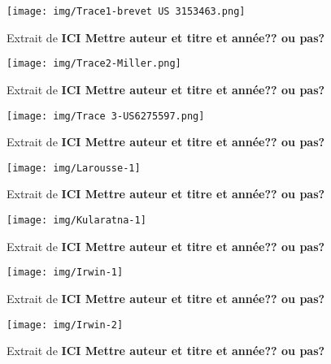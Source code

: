 \begin{figure}
\begin{center}
\texttt{[image: img/Trace1-brevet US 3153463.png]}
\end{center}
\caption{Extrait de \cite{f1964compound} \textbf{ICI Mettre auteur et titre et année?? ou pas?}} %
\label{Trace 1}
\end{figure}

\begin{figure}
\begin{center}
\texttt{[image: img/Trace2-Miller.png]}
\end{center}
\caption{Extrait de \cite[p.~2]{Miller} \textbf{ICI Mettre auteur et titre et année?? ou pas?}} %
\label{Trace 2}
\end{figure}

\begin{figure}
\begin{center}
\texttt{[image: img/Trace 3-US6275597.png]}
\end{center}
\caption{Extrait de \cite{US6275597} \textbf{ICI Mettre auteur et titre et année?? ou pas?}} %
 \label{Trace 3}
\end{figure}

\begin{figure}
\begin{center}
\texttt{[image: img/Larousse-1]}
\end{center}
\caption{Extrait de \cite[p.~6486]{Larousse} \textbf{ICI Mettre auteur et titre et année?? ou pas?}} %
\label{Trace 4}
\end{figure}

\begin{figure}
\begin{center}
\texttt{[image: img/Kularatna-1]}
\end{center}
\caption{Extrait de \cite[p.~249-251]{Kularatna}\textbf{ICI Mettre auteur et titre et année?? ou pas?}} %
\label{Trace 5}
\end{figure}

\begin{figure}
\begin{center}
\texttt{[image: img/Irwin-1]}
\end{center}
\caption{Extrait de \cite[p.~375]{Irwin}\textbf{ICI Mettre auteur et titre et année?? ou pas?}}%
\label{Trace 6}
\end{figure}

\begin{figure}
\begin{center}
\texttt{[image: img/Irwin-2]} 
\end{center}
\caption{Extrait de \cite[p.~376]{Irwin}\textbf{ICI Mettre auteur et titre et année?? ou pas?}}%
\label{Trace 7}
\end{figure}


\

\

 
 
 
 
 


